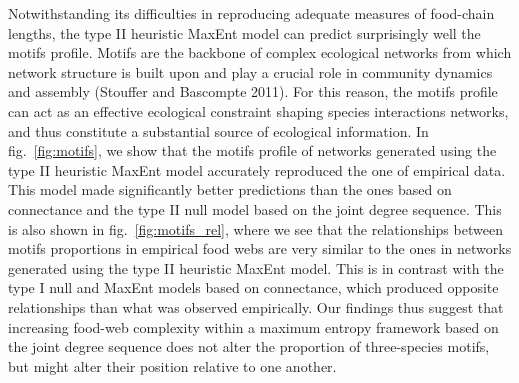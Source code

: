 \documentclass[11pt]{article}
\begin{document}
Notwithstanding its difficulties in reproducing adequate measures of
food-chain lengths, the type II heuristic MaxEnt model can predict
surprisingly well the motifs profile. Motifs are the backbone of complex
ecological networks from which network structure is built upon and play
a crucial role in community dynamics and assembly (Stouffer and
Bascompte 2011). For this reason, the motifs profile can act as an
effective ecological constraint shaping species interactions networks,
and thus constitute a substantial source of ecological information. In
fig.~\ref{fig:motifs}, we show that the motifs profile of networks
generated using the type II heuristic MaxEnt model accurately reproduced
the one of empirical data. This model made significantly better
predictions than the ones based on connectance and the type II null
model based on the joint degree sequence. This is also shown in
fig.~\ref{fig:motifs_rel}, where we see that the relationships between
motifs proportions in empirical food webs are very similar to the ones
in networks generated using the type II heuristic MaxEnt model. This is
in contrast with the type I null and MaxEnt models based on connectance,
which produced opposite relationships than what was observed
empirically. Our findings thus suggest that increasing food-web
complexity within a maximum entropy framework based on the joint degree
sequence does not alter the proportion of three-species motifs, but
might alter their position relative to one another.
\end{document}
